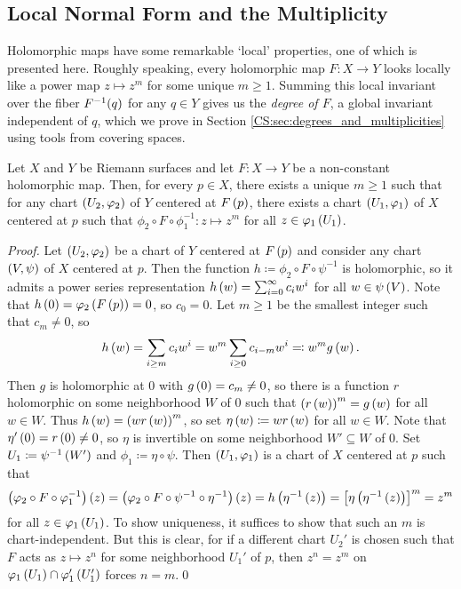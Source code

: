 \documentclass[../Moduli_Spaces_of_Riemann_Surfaces.tex]{subfiles}
\begin{document}
    \subsection{Local Normal Form and the Multiplicity}
    Holomorphic maps have some remarkable `local' properties, one of which is presented here. Roughly speaking, every holomorphic map $F:X\to Y$ looks locally like a power map $z\mapsto z^m$ for some unique $m\geq1$. Summing this local invariant over the fiber $F^{-1}\!\left(q\right)$ for any $q\in Y$ gives us the \textit{degree of $F$}, a global invariant independent of $q$, which we prove in Section \ref{CS:sec:degrees_and_multiplicities} using tools from covering spaces.
    \begin{theorem}\label{RS:thm:local_normal_form}
        Let $X$ and $Y$ be Riemann surfaces and let $F:X\to Y$ be a non-constant holomorphic map. Then, for every $p\in X$, there exists a unique $m\geq1$ such that for any chart $\left(U_2,\varphi_2\right)$ of $Y$ centered at $F\left(p\right)$, there exists a chart $\left(U_1,\varphi_1\right)$ of $X$ centered at $p$ such that $\phi_2\circ F\circ\phi_1^{-1}:z\mapsto z^m$ for all $z\in\varphi_1\left(U_1\right)$.
    \end{theorem}
    \begin{proof}
        Let $\left(U_2,\varphi_2\right)$ be a chart of $Y$ centered at $F\left(p\right)$ and consider any chart $\left(V,\psi\right)$ of $X$ centered at $p$. Then the function $h\coloneqq\phi_2\circ F\circ\psi^{-1}$ is holomorphic, so it admits a power series representation $h\left(w\right)=\sum_{i=0}^{\infty}c_iw^i$ for all $w\in\psi\left(V\right)$. Note that $h\left(0\right)=\varphi_2\left(F\left(p\right)\right)=0$, so $c_0=0$. Let $m\geq1$ be the smallest integer such that $c_m\neq0$, so
        \begin{equation*}
            h\left(w\right)=\sum_{i\geq m}c_iw^i=w^m\sum_{i\geq0}c_{i-m}w^i\eqqcolon w^mg\left(w\right).
        \end{equation*}
        Then $g$ is holomorphic at $0$ with $g\left(0\right)=c_m\neq0$, so there is a function $r$ holomorphic on some neighborhood $W$ of $0$ such that $\left(r\left(w\right)\right)^m=g\left(w\right)$ for all $w\in W$. Thus $h\left(w\right)=\left(wr\left(w\right)\right)^m$, so set $\eta\left(w\right)\coloneqq wr\left(w\right)$ for all $w\in W$. Note that $\eta'\left(0\right)=r\left(0\right)\neq0$, so $\eta$ is invertible on some neighborhood $W'\subseteq W$ of $0$. Set $U_1\coloneqq\psi^{-1}\left(W'\right)$ and $\phi_1\coloneqq\eta\circ\psi$. Then $\left(U_1,\varphi_1\right)$ is a chart of $X$ centered at $p$ such that
        \begin{equation*}
            \left(\varphi_2\circ F\circ\varphi_1^{-1}\right)\left(z\right)=\left(\varphi_2\circ F\circ\psi^{-1}\circ\eta^{-1}\right)\left(z\right)=h\left(\eta^{-1}\left(z\right)\right)=\left[\eta\left(\eta^{-1}\left(z\right)\right)\right]^m=z^m
        \end{equation*}
        for all $z\in\varphi_1\left(U_1\right)$. To show uniqueness, it suffices to show that such an $m$ is chart-independent. But this is clear, for if a different chart $U_2'$ is chosen such that $F$ acts as $z\mapsto z^n$ for some neighborhood $U_1'$ of $p$, then $z^n=z^m$ on $\varphi_1\left(U_1\right)\cap\varphi_1'\left(U_1'\right)$ forces $n=m$.\qed
    \end{proof}
\end{document}
